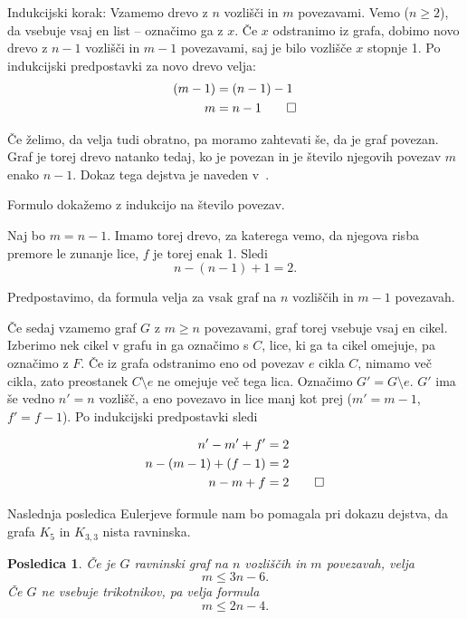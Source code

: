 \documentclass[12pt,a4paper]{amsart}
\theoremstyle{definition} %
\theoremstyle{plain} %
\newtheorem{posledica}[definicija]{Posledica}
\begin{document}
    Indukcijski korak: Vzamemo drevo z $n$ vozlišči in $m$ povezavami. Vemo ($n \geq 2$), da vsebuje vsaj en list -- označimo ga z $x$. Če $x$ odstranimo iz grafa, dobimo novo drevo z $n-1$ vozlišči in $m-1$ povezavami, saj je bilo vozlišče $x$ stopnje 1. Po indukcijski predpostavki za novo drevo velja:
    \begin{align*}
        (m-1) &= (n-1) - 1 \\
        m     &= n - 1 \qedhere
    \end{align*}
\endproof

Če želimo, da velja tudi obratno, pa moramo zahtevati še, da je graf povezan. Graf je torej drevo natanko tedaj, ko je povezan in je število njegovih povezav $m$ enako $n-1$. Dokaz tega dejstva je naveden v~\cite[str.~57]{bib:potocnik}.

    Formulo dokažemo z indukcijo na število povezav.
    
    Naj bo $m = n-1$. Imamo torej drevo, za katerega vemo, da njegova risba premore le zunanje lice, $f$ je torej enak 1. Sledi
    \[ n - (n-1) + 1 = 2. \]
    
    Predpostavimo, da formula velja za vsak graf na $n$ vozliščih in $m-1$ povezavah.
    
    Če sedaj vzamemo graf $G$ z $m \geq n$ povezavami, graf torej vsebuje vsaj en cikel. Izberimo nek cikel v grafu in ga označimo s $C$, lice, ki ga ta cikel omejuje, pa označimo z $F$. Če iz grafa odstranimo eno od povezav $e$ cikla $C$, nimamo več cikla, zato preostanek $C \setminus e$ ne omejuje več tega lica. Označimo $G' = G \setminus e$. $G'$ ima še vedno $n'=n$ vozlišč, a eno povezavo in lice manj kot prej ($m'=m-1$, $f'=f-1$). Po indukcijski predpostavki sledi
    
    \begin{align*}
        n' - m' + f'      &= 2 \\
        n - (m-1) + (f-1) &= 2 \\
        n - m + f         &= 2 \qedhere
    \end{align*}
\endproof

Naslednja posledica Eulerjeve formule nam bo pomagala pri dokazu dejstva, da grafa $K_5$ in $K_{3,3}$ nista ravninska.

\begin{posledica}
    Če je $G$ ravninski graf na $n$ vozliščih in $m$ povezavah, velja
    \begin{equation} 
    \label{eq:posledica-euler-formula}
    m \leq 3n - 6.
    \end{equation}
    Če $G$ ne vsebuje trikotnikov, pa velja formula
    \begin{equation} 
    \label{eq:posledica-euler-formula-trik}
    m \leq 2n - 4.
    \end{equation}
\end{posledica}
\end{document}
